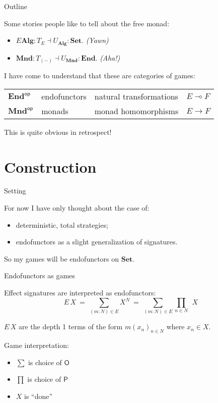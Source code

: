 \documentclass{beamer}
\begin{document}
\begin{frame}[fragile]{Outline} %

  Some stories people like to tell about the free monad:
  \begin{itemize}
    \item $E \mathbf{Alg} : T_E \dashv U_\mathbf{Alg} : \mathbf{Set}$.
      \emph{(Yawn)}
    \item $\mathbf{Mnd} : T_{(-)} \dashv U_\mathbf{Mnd} : \mathbf{End}$.
      \emph{(Aha!)}
  \end{itemize}

  I have come to understand that these are categories of games:
  \begin{center}
    \begin{tabular}{llll}
      \hline
      $\mathbf{End}^\mathsf{op}$ &
        endofunctors &
        natural transformations &
        $E \multimap F$
      \\
      $\mathbf{Mnd}^\mathsf{op}$ &
        monads &
        monad homomorphisms &
        $E \rightarrow F$
      \\
      \hline
    \end{tabular}
  \end{center}

  This is quite obvious in retrospect!

\end{frame}

\section{Construction}
\frame{\sectionpage}

\begin{frame}{Setting} %

  For now I have only thought about the case of:
  \begin{itemize}
    \item deterministic, total strategies;
    \item endofunctors as a slight generalization of signatures.
  \end{itemize}

  So my games will be endofunctors on $\mathbf{Set}$.

\end{frame}

\begin{frame}{Endofunctors as games} %

  Effect signatures are interpreted as endofunctors:
  \[
    E \, X \:=\: \sum_{(m : N) \in E} X^N
        \:=\: \sum_{(m : N) \in E} \prod_{n \in N} \:\: X
  \]

  $E \, X$ are the depth 1 terms of the form
  $m(x_n)_{n \in N}$ where $x_n \in X$.

  \vfill
  Game interpretation:
  \begin{itemize}
    \item $\sum$ is choice of $\mathsf{O}$
    \item $\prod$ is choice of $\mathsf{P}$
    \item $X$ is ``done''
  \end{itemize}

\end{frame}
\end{document}
